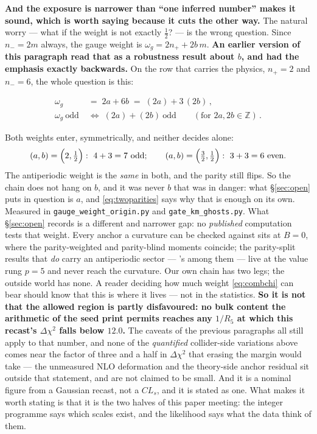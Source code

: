 \documentclass[11pt,a4paper]{article}
\newcommand{\ZZ}{\mathbb{Z}}
\newenvironment{keyeq}
  {\begin{center}\setlength{\fboxsep}{9pt}\setlength{\fboxrule}{0.8pt}%
   \begin{lrbox}{\keyeqbox}\begin{minipage}{0.88\textwidth}}
  {\end{minipage}\end{lrbox}%
   \fcolorbox{hdrblue!55}{hdrblue!6}{\usebox{\keyeqbox}}\end{center}}
\begin{document}
\noindent \textbf{And the exposure is narrower than ``one inferred number'' makes it sound, which
is worth saying because it cuts the other way.} The natural worry --- what if the weight is not
exactly $\tfrac12$? --- is the wrong question. Since $n_-=2m$ always, the gauge weight is
$\omega_g=2n_++2b\,m$. \textbf{An earlier version of this paragraph read that as a robustness
result about $b$, and had the emphasis exactly backwards.} On the row that carries the physics,
$n_+=2$ and $n_-=6$, the whole question is this:
\begin{keyeq}
\begin{equation}\label{eq:twoparities}
  \begin{aligned}
    \omega_g\;&=\;2a+6b\;=\;(2a)+3\,(2b)\,,\\[2pt]
    \omega_g\ \text{odd}\;&\iff\;(2a)+(2b)\ \text{odd}\qquad(\text{for }2a,2b\in\ZZ)\,.
  \end{aligned}
\end{equation}
\end{keyeq}
\noindent Both weights enter, symmetrically, and neither decides alone:
\[
  (a,b)=\Bigl(2,\tfrac12\Bigr):\ 4+3=7\ \text{odd};\qquad
  (a,b)=\Bigl(\tfrac32,\tfrac12\Bigr):\ 3+3=6\ \text{even}.
\]
The antiperiodic weight is the \emph{same} in both, and the parity still flips. So the chain does
not hang on $b$, and it was never $b$ that was in danger: what \S\ref{sec:open} puts in question
is $a$, and \eqref{eq:twoparities} says why that is enough on its own.
Measured in \texttt{gauge\_\allowbreak weight\_\allowbreak origin.py} and
\texttt{gate\_\allowbreak km\_\allowbreak ghosts.py}. What \S\ref{sec:open} records
is a different and narrower gap: no \emph{published} computation tests that weight. Every anchor a
curvature can be checked against sits at $B=0$, where the parity-weighted and parity-blind moments
coincide; the parity-split results that \emph{do} carry an antiperiodic sector --- \cite{CCD24}'s
among them --- live at the value rung $p=5$ and never reach the curvature. Our own
chain has two legs; the outside world has none. A reader deciding how much weight
\eqref{eq:combchi} can bear should know that this is where it lives --- not in the statistics. \textbf{So it is not that the allowed region is partly disfavoured: no bulk
content the arithmetic of the seed \cite{KM25} print permits reaches any $1/R_5$ at which this
recast's $\Delta\chi^2$ falls below $12.0$.} The caveats of the previous paragraphs all still apply to that number, and none of the
\emph{quantified} collider-side variations above comes near the factor of three and a half in
$\Delta\chi^2$ that erasing the margin would take --- the unmeasured NLO deformation and the
theory-side anchor residual sit outside that statement, and are not claimed to be small. And it is a
nominal figure from a Gaussian recast, not a $CL_s$, and it is stated as one. What makes it worth
stating is that it is the two halves of this paper meeting: the integer programme says which
scales exist, and the likelihood says what the data think of them.
\end{document}
